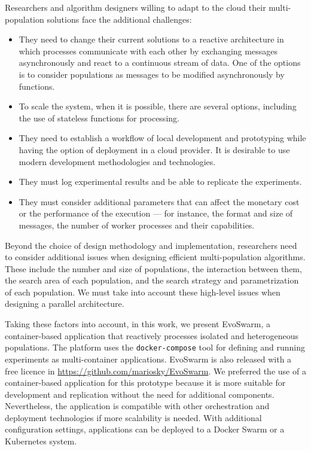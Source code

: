 \documentclass[review]{elsarticle}
\begin{document}
Researchers 
and algorithm designers willing to  adapt to the cloud their
multi-population solutions face the additional challenges:
\begin{itemize}
    \item They need to change their current solutions to a reactive architecture in which processes
    communicate with each other by exchanging messages asynchronously and react
    to a continuous stream of data. One of the options is to consider
    populations as messages to be modified asynchronously by functions. 

    \item To scale the system, when it is possible, there are several options, including the  use of stateless functions for
    processing. 

    \item They need to establish a workflow of local development and prototyping while having the 
    option of deployment in a cloud provider. It is desirable to use modern development methodologies and technologies. 

    \item They must log experimental results and be able to replicate the experiments. 

    \item They must consider additional parameters that can affect the monetary cost or the performance of the
    execution — for instance, the format and size of messages, the number of
    worker processes and their capabilities.  
\end{itemize}

Beyond the choice of design methodology and implementation, researchers need to
consider additional issues \cite{Ma2019} when designing efficient multi-population algorithms. These include the number and size of populations,
the interaction between them, the search area of each population, and the search
strategy and parametrization of each population. We must take into account
these high-level issues when designing a parallel architecture.

Taking these factors into account, in this work, we present EvoSwarm, 
a container-based application that reactively processes
isolated and
heterogeneous populations. The platform uses the {\tt docker-compose} tool for
defining and running experiments as multi-container applications. EvoSwarm is also released with a free licence in \url{https://github.com/mariosky/EvoSwarm}.
We preferred the use of a container-based application for this prototype because
it is more suitable for development and replication without the need for
additional components. Nevertheless, the application is compatible with other
orchestration and deployment technologies if more scalability is needed. 
With additional configuration settings, applications can be deployed 
to a Docker Swarm or a Kubernetes system.  
\end{document}
